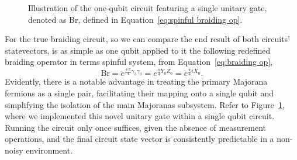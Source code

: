 \documentclass{article}
\begin{document}
\begin{figure}
	\begin{center}
		
	\end{center}
	\caption{Illustration of the one-qubit circuit featuring a single unitary gate, denoted as Br, defined in Equation~\ref{eq:spinful braiding op}.}\label{fig:br circuit}
\end{figure}
For the true braiding circuit, so we can compare the end result of both circuits' statevectors, is as simple as one qubit applied to it the following redefined braiding operator in terms spinful system, from Equation~\ref{eq:braiding op},
\begin{equation}
	\text{Br} = e^{\frac{\pm \pi}{4} \gamma_3 \gamma_0} = e^{\frac{\pi}{4} Y_0 Z_0} = e^{\frac{\pi}{4} i X_0}.
	\label{eq:spinful braiding op}
\end{equation}
Evidently, there is a notable advantage in treating the primary Majorana fermions as a single pair, facilitating their mapping onto a single qubit and simplifying the isolation of the main Majoranas subsystem. Refer to Figure~\ref{fig:br circuit}, where we implemented this novel unitary gate within a single qubit circuit. Running the circuit only once suffices, given the absence of measurement operations, and the final circuit state vector is consistently predictable in a non-noisy environment.
\end{document}

